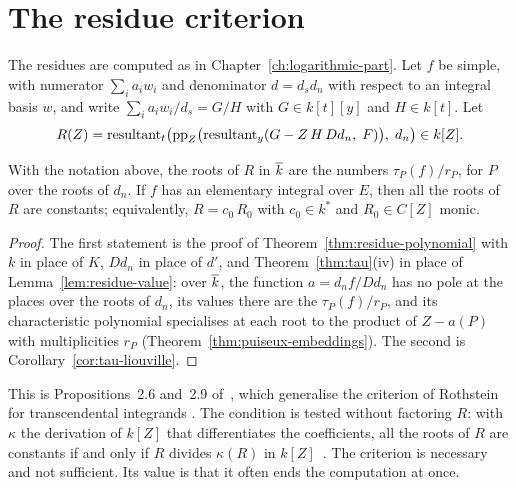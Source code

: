 \section{The residue criterion}\label{sec:mono-criterion}

The residues are computed as in Chapter~\ref{ch:logarithmic-part}. Let $f$
be simple, with numerator $\sum_i a_i w_i$ and denominator $d = d_s d_n$ with
respect to an integral basis $w$, and write $\sum_i a_i w_i / d_s = G/H$ with
$G \in k[t][y]$ and $H \in k[t]$. Let
\begin{equation}\label{eq:mixed-resultant}
  R(Z) = \operatorname{resultant}_t\bigl( \operatorname{pp}_Z\bigl(
           \operatorname{resultant}_y( G - Z\, H\, Dd_n,\; F ) \bigr),\; d_n \bigr) \in k[Z] .
\end{equation}

\begin{theorem}\label{thm:residue-criterion}
With the notation above, the roots of $R$ in $\overline{k}$ are the numbers
$\tau_P(f)/r_P$, for $P$ over the roots of $d_n$. If $f$ has an elementary
integral over $E$, then all the roots of $R$ are constants; equivalently, $R
= c_0\, R_0$ with $c_0 \in k^*$ and $R_0 \in C[Z]$ monic.
\end{theorem}

\begin{proof}
The first statement is the proof of Theorem~\ref{thm:residue-polynomial}
with $k$ in place of $K$, $Dd_n$ in place of $d'$, and
Theorem~\ref{thm:tau}(iv) in place of Lemma~\ref{lem:residue-value}: over
$\overline{k}$, the function $a = d_n f / Dd_n$ has no pole at the places over the
roots of $d_n$, its values there are the $\tau_P(f)/r_P$, and its
characteristic polynomial specialises at each root to the product of $Z -
a(P)$ with multiplicities $r_P$ (Theorem~\ref{thm:puiseux-embeddings}). The
second is Corollary~\ref{cor:tau-liouville}.
\end{proof}

This is Propositions~2.6 and~2.9 of~\cite{bronstein1990}, which generalise
the criterion of Rothstein for transcendental integrands
. The condition is tested without factoring $R$: with
$\kappa$ the derivation of $k[Z]$ that differentiates the coefficients, all
the roots of $R$ are constants if and only if $R$ divides $\kappa(R)$ in
$k[Z]$~\cite[\S3.8]{bronstein1998tutorial}. The criterion is necessary and
not sufficient. Its value is that it often ends the computation at once.

